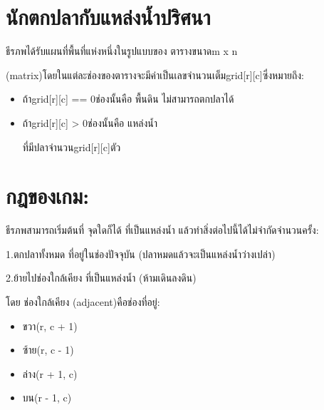 \documentclass{article}
\begin{document}
\section*{นักตกปลากับแหล่งน้ำปริศนา}

ธีรภพได้รับแผนที่พื้นที่แห่งหนึ่งในรูปแบบของ ตารางขนาดm x n

(matrix)โดยในแต่ละช่องของตารางจะมีค่าเป็นเลขจำนวนเต็มgrid{[}r{]}{[}c{]}ซึ่งหมายถึง:\\



\begin{itemize}

\tightlist

\item

  ถ้าgrid{[}r{]}{[}c{]} == 0ช่องนั้นคือ พื้นดิน ไม่สามารถตกปลาได้

\item

  ถ้าgrid{[}r{]}{[}c{]} \textgreater{} 0ช่องนั้นคือ แหล่งน้ำ

  ที่มีปลาจำนวนgrid{[}r{]}{[}c{]}ตัว

\end{itemize}



\section{\texorpdfstring{\textbf{กฎของเกม:}}{กฎของเกม:}}\label{uxe01uxe0euxe02uxe2duxe07uxe40uxe01uxe21}



ธีรภพสามารถเริ่มต้นที่ จุดใดก็ได้ ที่เป็นแหล่งน้ำ แล้วทำสิ่งต่อไปนี้ได้ไม่จำกัดจำนวนครั้ง:



1.ตกปลาทั้งหมด ที่อยู่ในช่องปัจจุบัน (ปลาหมดแล้วจะเป็นแหล่งน้ำว่างเปล่า)



2.ย้ายไปช่องใกล้เคียง ที่เป็นแหล่งน้ำ (ห้ามเดินลงดิน)



โดย ช่องใกล้เคียง (adjacent)คือช่องที่อยู่:



\begin{itemize}

\tightlist

\item

  ขวา(r, c + 1)

\item

  ซ้าย(r, c - 1)

\item

  ล่าง(r + 1, c)

\item

  บน(r - 1, c)

\end{itemize}
\end{document}
